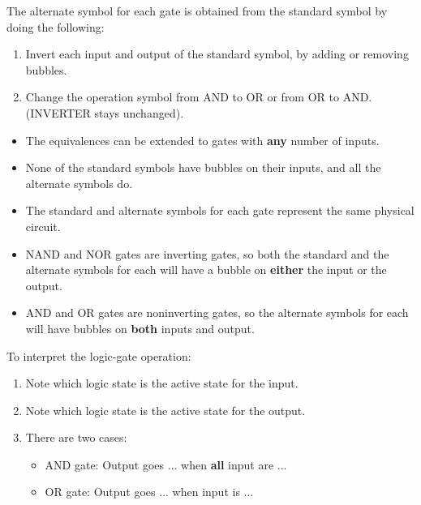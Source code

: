         \par The alternate symbol for each gate is obtained from the standard symbol by doing the
        following:
        \begin{enumerate}
            \item Invert each input and output of the standard symbol, by adding or removing bubbles.
            \item Change the operation symbol from AND to OR or from OR to AND.
                (INVERTER stays unchanged).
        \end{enumerate}
        \begin{itemize}
            \item The equivalences can be extended to gates with \textbf{any} number of inputs.
            \item None of the standard symbols have bubbles on their inputs, and all the alternate
                symbols do.
            \item The standard and alternate symbols for each gate represent the same physical
                circuit.
            \item NAND and NOR gates are inverting gates, so both the standard and the alternate
                symbols for each will have a bubble on \textbf{either} the input or the output.
            \item AND and OR gates are noninverting gates, so the alternate symbols for each will
                have bubbles on \textbf{both} inputs and output.
        \end{itemize}
        \par To interpret the logic-gate operation:
        \begin{enumerate}
            \item Note which logic state is the active state for the input.
            \item Note which logic state is the active state for the output.
            \item There are two cases:
                \begin{itemize}
                    \item AND gate: Output goes ... when \textbf{all} input are ...
                    \item OR gate: Output goes ... when  input is ...
                \end{itemize}
        \end{enumerate}

